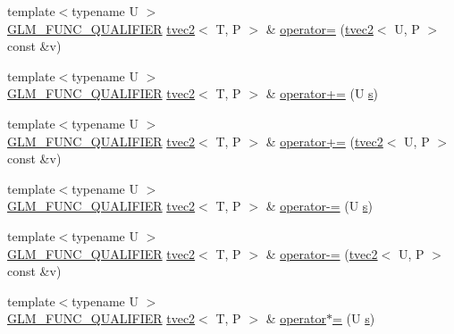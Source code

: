 \begin{DoxyCompactItemize}
\item 
{\footnotesize template$<$typename U $>$ }\\\hyperlink{setup_8hpp_a33fdea6f91c5f834105f7415e2a64407}{G\+L\+M\+\_\+\+F\+U\+N\+C\+\_\+\+Q\+U\+A\+L\+I\+F\+I\+ER} \hyperlink{structglm_1_1detail_1_1tvec2}{tvec2}$<$ T, P $>$ \& \hyperlink{structglm_1_1detail_1_1tvec2_ac89b8aa7379fe8d552c555d6791a8ae1}{operator=} (\hyperlink{structglm_1_1detail_1_1tvec2}{tvec2}$<$ U, P $>$ const \&v)
\item 
{\footnotesize template$<$typename U $>$ }\\\hyperlink{setup_8hpp_a33fdea6f91c5f834105f7415e2a64407}{G\+L\+M\+\_\+\+F\+U\+N\+C\+\_\+\+Q\+U\+A\+L\+I\+F\+I\+ER} \hyperlink{structglm_1_1detail_1_1tvec2}{tvec2}$<$ T, P $>$ \& \hyperlink{structglm_1_1detail_1_1tvec2_a5e554e1eddaa2b17c7974c117c9123e2}{operator+=} (U \hyperlink{structglm_1_1detail_1_1tvec2_a6d602cf7c31b75396944d828ad2aea72}{s})
\item 
{\footnotesize template$<$typename U $>$ }\\\hyperlink{setup_8hpp_a33fdea6f91c5f834105f7415e2a64407}{G\+L\+M\+\_\+\+F\+U\+N\+C\+\_\+\+Q\+U\+A\+L\+I\+F\+I\+ER} \hyperlink{structglm_1_1detail_1_1tvec2}{tvec2}$<$ T, P $>$ \& \hyperlink{structglm_1_1detail_1_1tvec2_ab3b31e72f4dfa1ad16b84ac277ea83e4}{operator+=} (\hyperlink{structglm_1_1detail_1_1tvec2}{tvec2}$<$ U, P $>$ const \&v)
\item 
{\footnotesize template$<$typename U $>$ }\\\hyperlink{setup_8hpp_a33fdea6f91c5f834105f7415e2a64407}{G\+L\+M\+\_\+\+F\+U\+N\+C\+\_\+\+Q\+U\+A\+L\+I\+F\+I\+ER} \hyperlink{structglm_1_1detail_1_1tvec2}{tvec2}$<$ T, P $>$ \& \hyperlink{structglm_1_1detail_1_1tvec2_aa1c0434d611d89e971c8f99d332fd634}{operator-\/=} (U \hyperlink{structglm_1_1detail_1_1tvec2_a6d602cf7c31b75396944d828ad2aea72}{s})
\item 
{\footnotesize template$<$typename U $>$ }\\\hyperlink{setup_8hpp_a33fdea6f91c5f834105f7415e2a64407}{G\+L\+M\+\_\+\+F\+U\+N\+C\+\_\+\+Q\+U\+A\+L\+I\+F\+I\+ER} \hyperlink{structglm_1_1detail_1_1tvec2}{tvec2}$<$ T, P $>$ \& \hyperlink{structglm_1_1detail_1_1tvec2_a08f1294adb7685695d5efa49c7cbe5e7}{operator-\/=} (\hyperlink{structglm_1_1detail_1_1tvec2}{tvec2}$<$ U, P $>$ const \&v)
\item 
{\footnotesize template$<$typename U $>$ }\\\hyperlink{setup_8hpp_a33fdea6f91c5f834105f7415e2a64407}{G\+L\+M\+\_\+\+F\+U\+N\+C\+\_\+\+Q\+U\+A\+L\+I\+F\+I\+ER} \hyperlink{structglm_1_1detail_1_1tvec2}{tvec2}$<$ T, P $>$ \& \hyperlink{structglm_1_1detail_1_1tvec2_ae5c779a289045f3a99c6ee7efa608248}{operator$\ast$=} (U \hyperlink{structglm_1_1detail_1_1tvec2_a6d602cf7c31b75396944d828ad2aea72}{s})

\end{DoxyCompactItemize}
